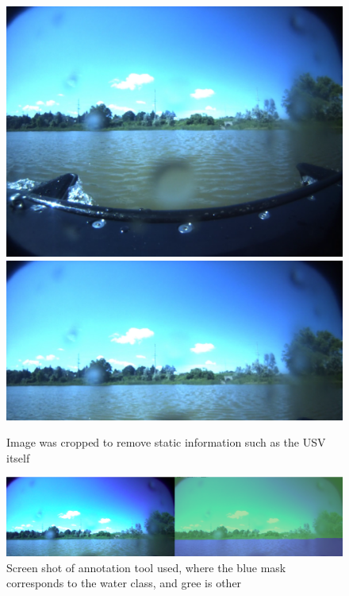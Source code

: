 \documentclass[10pt,twocolumn,letterpaper]{article}
\begin{document}
\begin{figure}[t]	
\begin{center}
  \includegraphics[width=1.0\linewidth]{CL_0025.png}
  \includegraphics[width=1.0\linewidth]{CL_0025C.png}
\end{center}
   \caption{Image was cropped to remove static information such as the USV itself}
\label{fig:crop}
\end{figure}

\begin{figure}	
\begin{center}
  \includegraphics[width=1.0\linewidth]{segmenttool.png}
\end{center}
   \caption{Screen shot of annotation tool used, where the blue mask corresponds to the water class, and gree is other}
\label{fig:tool}
\end{figure}
\end{document}
